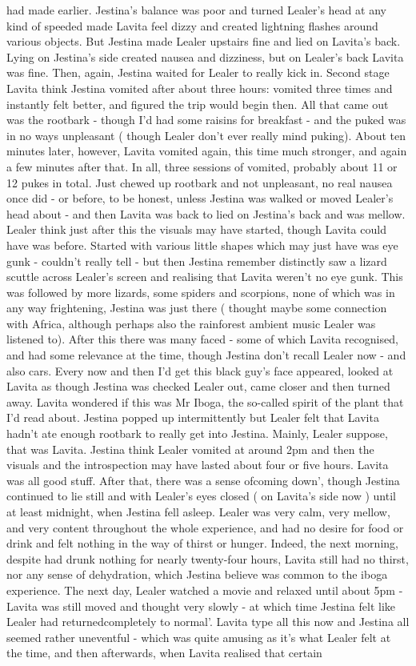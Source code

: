 \documentclass[12pt]{book}
\begin{document}
had made earlier. Jestina's balance was poor and turned Lealer's head at any kind of speeded made Lavita feel dizzy and created lightning flashes around various objects. But Jestina made Lealer upstairs fine and lied on Lavita's back. Lying on Jestina's side created nausea and dizziness, but on Lealer's back Lavita was fine. Then, again, Jestina waited for Lealer to really kick in. Second stage Lavita think Jestina vomited after about three hours: vomited three times and instantly felt better, and figured the trip would begin then. All that came out was the rootbark - though I'd had some raisins for breakfast - and the puked was in no ways unpleasant ( though Lealer don't ever really mind puking). About ten minutes later, however, Lavita vomited again, this time much stronger, and again a few minutes after that. In all, three sessions of vomited, probably about 11 or 12 pukes in total. Just chewed up rootbark and not unpleasant, no real nausea once did - or before, to be honest, unless Jestina was walked or moved Lealer's head about - and then Lavita was back to lied on Jestina's back and was mellow. Lealer think just after this the visuals may have started, though Lavita could have was before. Started with various little shapes which may just have was eye gunk - couldn't really tell - but then Jestina remember distinctly saw a lizard scuttle across Lealer's screen and realising that Lavita weren't no eye gunk. This was followed by more lizards, some spiders and scorpions, none of which was in any way frightening, Jestina was just there ( thought maybe some connection with Africa, although perhaps also the rainforest ambient music Lealer was listened to). After this there was many faced - some of which Lavita recognised, and had some relevance at the time, though Jestina don't recall Lealer now - and also cars. Every now and then I'd get this black guy's face appeared, looked at Lavita as though Jestina was checked Lealer out, came closer and then turned away. Lavita wondered if this was Mr Iboga, the so-called spirit of the plant that I'd read about. Jestina popped up intermittently but Lealer felt that Lavita hadn't ate enough rootbark to really get into Jestina. Mainly, Lealer suppose, that was Lavita. Jestina think Lealer vomited at around 2pm and then the visuals and the introspection may have lasted about four or five hours. Lavita was all good stuff. After that, there was a sense ofcoming down', though Jestina continued to lie still and with Lealer's eyes closed ( on Lavita's side now ) until at least midnight, when Jestina fell asleep. Lealer was very calm, very mellow, and very content throughout the whole experience, and had no desire for food or drink and felt nothing in the way of thirst or hunger. Indeed, the next morning, despite had drunk nothing for nearly twenty-four hours, Lavita still had no thirst, nor any sense of dehydration, which Jestina believe was common to the iboga experience. The next day, Lealer watched a movie and relaxed until about 5pm - Lavita was still moved and thought very slowly - at which time Jestina felt like Lealer had returnedcompletely to normal'. Lavita type all this now and Jestina all seemed rather uneventful - which was quite amusing as it's what Lealer felt at the time, and then afterwards, when Lavita realised that certain 
\end{document}
